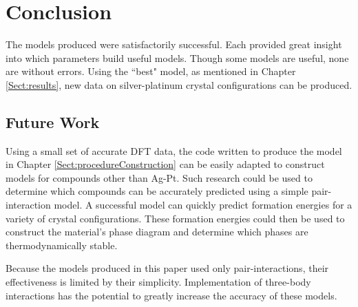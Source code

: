 \chapter{Conclusion}\label{Sect:conclusion}
\par The models produced were satisfactorily successful. Each provided great insight into which parameters build useful models. Though some models are useful, none are without errors. Using the ``best" model, as mentioned in Chapter \ref{Sect:results}, new data on silver-platinum crystal configurations can be produced.


\section{Future Work}\label{Sect:futureWork}
\par Using a small set of accurate DFT data, the code written to produce the model in Chapter \ref{Sect:procedureConstruction} can be easily adapted to construct models for compounds other than Ag-Pt. Such research could be used to determine which compounds can be accurately predicted using a simple pair-interaction model. A successful model can quickly predict formation energies for a variety of crystal configurations. These formation energies could then be used to construct the material’s phase diagram and determine which phases are thermodynamically stable.
\par Because the models produced in this paper used only pair-interactions, their effectiveness is limited by their simplicity. Implementation of three-body interactions has the potential to greatly increase the accuracy of these models.
